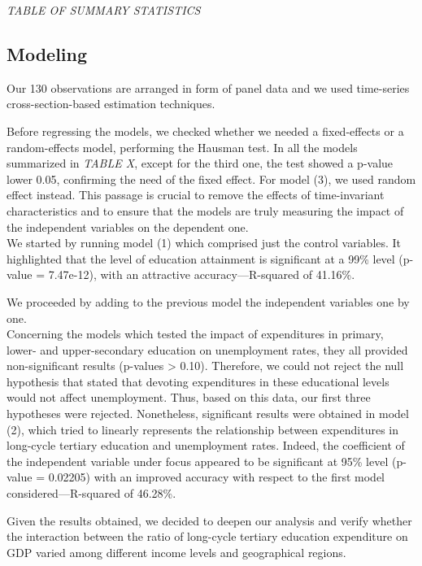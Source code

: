 \documentclass[
]{article}
\begin{document}
\emph{TABLE OF SUMMARY STATISTICS}

\hypertarget{modeling}{%
\subsection{Modeling}\label{modeling}}

Our 130 observations are arranged in form of panel data and we used
time-series cross-section-based estimation techniques.

Before regressing the models, we checked whether we needed a
fixed-effects or a random-effects model, performing the Hausman test. In
all the models summarized in \emph{TABLE X}, except for the third one,
the test showed a p-value lower 0.05, confirming the need of the fixed
effect. For model (3), we used random effect instead. This passage is
crucial to remove the effects of time-invariant characteristics and to
ensure that the models are truly measuring the impact of the independent
variables on the dependent one.\\
We started by running model (1) which comprised just the control
variables. It highlighted that the level of education attainment is
significant at a 99\% level (p-value = 7.47e-12), with an attractive
accuracy---R-squared of 41.16\%.

We proceeded by adding to the previous model the independent variables
one by one.\\
Concerning the models which tested the impact of expenditures in
primary, lower- and upper-secondary education on unemployment rates,
they all provided non-significant results (p-values \textgreater{}
0.10). Therefore, we could not reject the null hypothesis that stated
that devoting expenditures in these educational levels would not affect
unemployment. Thus, based on this data, our first three hypotheses were
rejected. Nonetheless, significant results were obtained in model (2),
which tried to linearly represents the relationship between expenditures
in long-cycle tertiary education and unemployment rates. Indeed, the
coefficient of the independent variable under focus appeared to be
significant at 95\% level (p-value = 0.02205) with an improved accuracy
with respect to the first model considered---R-squared of 46.28\%.

Given the results obtained, we decided to deepen our analysis and verify
whether the interaction between the ratio of long-cycle tertiary
education expenditure on GDP varied among different income levels and
geographical regions.
\end{document}
